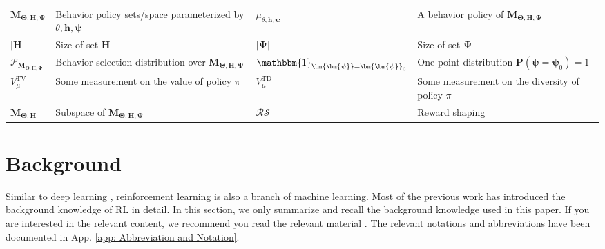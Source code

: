 \begin{table}[!hb]
{\begin{tabular}{l l l l }
	    $\mathbf{M}_{\bm{\bm{\Theta}},\mathbf{H},\bm{\Psi}}$ & Behavior policy sets/space parameterized by $\theta,\mathbf{h},\bm{\bm{\psi}}$ 
 & $\mu_{\theta,\mathbf{h},\bm{\bm{\psi}}}$ & A behavior policy of $\mathbf{M}_{\bm{\bm{\Theta}},\mathbf{H},\bm{\Psi}}$\\

        $|\mathbf{H}|$ & Size of set $\mathbf{H}$ & $|\bm{\Psi}|$ &  Size of set $\bm{\Psi}$ \\
	    
	    $\mathcal{P}_{\mathbf{M}_{{\bm{\bm{\Theta}},\mathbf{H},\bm{\Psi}}}}$ & Behavior selection distribution over $\mathbf{M}_{{\bm{\bm{\Theta}},\mathbf{H},\bm{\Psi}}}$& $\mathbbm{1}_{\bm{\bm{\psi}} = \bm{\bm{\psi}}_0}$ & One-point distribution $\textbf{P}(\bm{\bm{\psi}}=\bm{\bm{\psi}}_0)=1$ \\
	    
     $V_{\mu}^{\mathrm{TV}}$ &  Some measurement on the value of policy $\pi$ & $V_{\mu}^{\mathrm{TD}}$ & Some measurement on the  diversity of policy $\pi$ \\

     	      $\mathbf{M}_{\bm{\bm{\Theta}},\mathbf{H}}$ & Subspace of $\mathbf{M}_{\bm{\bm{\Theta}},\mathbf{H},\bm{\Psi}}$  & $\mathcal{RS}$ & Reward shaping\\
	    \bottomrule	    
	\end{tabular} 
 }
\end{table}




































\clearpage
\section{Background}
\label{app: background on RL}


Similar to deep learning \citep{cl,actionr,6d,dclsr,wang2023dr,wang2022lhnn}, reinforcement learning is also a branch of machine learning.  Most of the previous work has introduced the background knowledge of RL in detail. In this section, we only summarize and recall the background knowledge used in this paper. If you are interested in the relevant content, we recommend you read the relevant material \citep{pi2,sutton}. The relevant notations and abbreviations have been documented in App. \ref{app: Abbreviation and Notation}.


